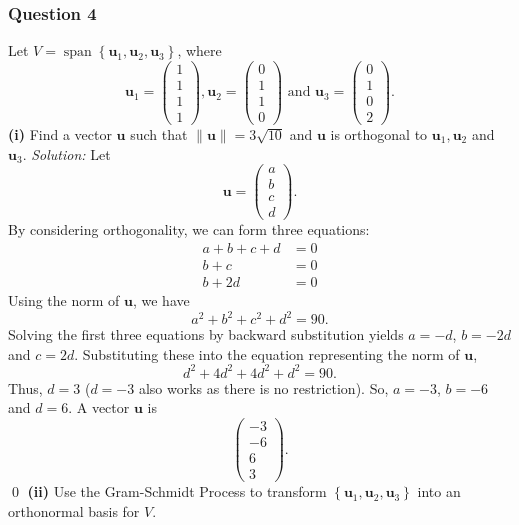 \documentclass{article}
\begin{document}
\subsubsection*{Question 4}
Let $V=\operatorname{span}\left\{\mathbf{u}_1,\mathbf{u}_2,\mathbf{u}_3\right\}$, where \[\mathbf{u}_1=\begin{pmatrix}1\\1\\1\\1\end{pmatrix},\mathbf{u}_2=\begin{pmatrix}0\\1\\1\\0\end{pmatrix}\text{ and }\mathbf{u}_3=\begin{pmatrix}0\\1\\0\\2\end{pmatrix}.\]
\textbf{(i)} Find a vector $\mathbf{u}$ such that $\left\| \mathbf{u} \right\|=3\sqrt{10}$ and $\mathbf{u}$ is orthogonal to $\mathbf{u}_1,\mathbf{u}_2$ and $\mathbf{u}_3$.
\newline
\newline\textit{Solution:} Let \[\mathbf{u}=\begin{pmatrix}a\\b\\c\\d\end{pmatrix}.\] By considering orthogonality, we can form three equations: \begin{align*}
    a+b+c+d&=0\\
    b+c&=0\\
    b+2d&=0
\end{align*}
Using the norm of $\mathbf{u}$, we have \[a^2+b^2+c^2+d^2=90.\] Solving the first three equations by backward substitution yields $a=-d$, $b=-2d$ and $c=2d$. Substituting these into the equation representing the norm of $\mathbf{u}$, \[d^2+4d^2+4d^2+d^2=90.\] Thus, $d=3$ ($d=-3$ also works as there is no restriction). So, $a=-3$, $b=-6$ and $d=6$. A vector $\mathbf{u}$ is \[\begin{pmatrix} -3\\-6\\6\\3\end{pmatrix}.\] \qed
\newline
\newline\textbf{(ii)} Use the Gram-Schmidt Process to transform $\left\{\mathbf{u}_1,\mathbf{u}_2,\mathbf{u}_3\right\}$ into an orthonormal basis for $V$.
\end{document}
